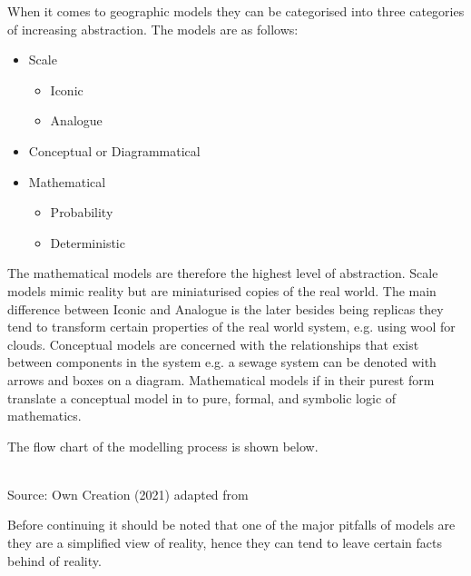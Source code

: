 When it comes to geographic models they can be categorised into three categories of increasing abstraction\citep{thomas1980modelling}. The models are as follows:
\begin{itemize}
\item Scale
\begin{itemize}
\item Iconic
\item Analogue
\end{itemize}
\item Conceptual or Diagrammatical
\item Mathematical
\begin{itemize}
\item Probability
\item Deterministic 
\end{itemize}
\end{itemize}
The mathematical models are therefore the highest level of abstraction. Scale models mimic reality but are miniaturised copies of the real world. The main difference between Iconic and Analogue is the later besides being replicas they tend to transform certain properties of the real world system, e.g. using wool for clouds. Conceptual models are concerned with the relationships that exist between components in the system e.g. a sewage system can be denoted with arrows and boxes on a diagram. Mathematical models if in their purest form translate a conceptual model in to pure, formal, and symbolic logic of mathematics\citep{thomas1980modelling}.

The flow chart of the modelling process is shown below.
\begin{center}
\\Source: Own Creation (2021) adapted from \citep{liu2008modelling}
\end{center}
Before continuing it should be noted that one of the major pitfalls of models are they are a simplified view of reality, hence they can tend to leave certain facts behind of reality\citep{liu2008modelling}.

